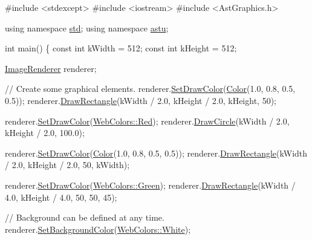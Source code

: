 \begin{DoxyCode}
\textcolor{preprocessor}{#include <stdexcept>}
\textcolor{preprocessor}{#include <iostream>}
\textcolor{preprocessor}{#include <AstGraphics.h>}

\textcolor{keyword}{using namespace }\hyperlink{namespacestd}{std};
\textcolor{keyword}{using namespace }\hyperlink{namespaceastu}{astu};

\textcolor{keywordtype}{int} main()
\{
  \textcolor{keyword}{const} \textcolor{keywordtype}{int} kWidth = 512;
  \textcolor{keyword}{const} \textcolor{keywordtype}{int} kHeight = 512;

  \hyperlink{classastu_1_1ImageRenderer}{ImageRenderer} renderer;

  \textcolor{comment}{// Create some graphical elements.}
  renderer.\hyperlink{classastu_1_1ImageRenderer_ae2de9a19765358aaf0ce3b0086afe593}{SetDrawColor}(\hyperlink{classastu_1_1Color}{Color}(1.0, 0.8, 0.5, 0.5));
  renderer.\hyperlink{classastu_1_1ImageRenderer_a95ed0bcec030e0ab17d0c6abc104eac3}{DrawRectangle}(kWidth / 2.0, kHeight / 2.0, kHeight, 50);

  renderer.\hyperlink{classastu_1_1ImageRenderer_ae2de9a19765358aaf0ce3b0086afe593}{SetDrawColor}(\hyperlink{classastu_1_1WebColors_ac75482e858498b1b3fa521ba93fcda98a56bb31647b5e647e11d2941f54a30781}{WebColors::Red});
  renderer.\hyperlink{classastu_1_1ImageRenderer_a903b1b78edee5f09b9ee1f604d762c28}{DrawCircle}(kWidth / 2.0, kHeight / 2.0, 100.0);

  renderer.\hyperlink{classastu_1_1ImageRenderer_ae2de9a19765358aaf0ce3b0086afe593}{SetDrawColor}(\hyperlink{classastu_1_1Color}{Color}(1.0, 0.8, 0.5, 0.5));
  renderer.\hyperlink{classastu_1_1ImageRenderer_a95ed0bcec030e0ab17d0c6abc104eac3}{DrawRectangle}(kWidth / 2.0, kHeight / 2.0, 50, kWidth);

  renderer.\hyperlink{classastu_1_1ImageRenderer_ae2de9a19765358aaf0ce3b0086afe593}{SetDrawColor}(\hyperlink{classastu_1_1WebColors_ac75482e858498b1b3fa521ba93fcda98a938abc8e640528db0015428eb2f02648}{WebColors::Green});
  renderer.\hyperlink{classastu_1_1ImageRenderer_a95ed0bcec030e0ab17d0c6abc104eac3}{DrawRectangle}(kWidth / 4.0, kHeight / 4.0, 50, 50, 45);

  \textcolor{comment}{// Background can be defined at any time.}
  renderer.\hyperlink{classastu_1_1ImageRenderer_a01d5e67526360be932393a0ec477147c}{SetBackgroundColor}(\hyperlink{classastu_1_1WebColors_ac75482e858498b1b3fa521ba93fcda98acc916d617a3ce8d3e4b9716bbdc231e5}{WebColors::White});



\end{DoxyCode}
